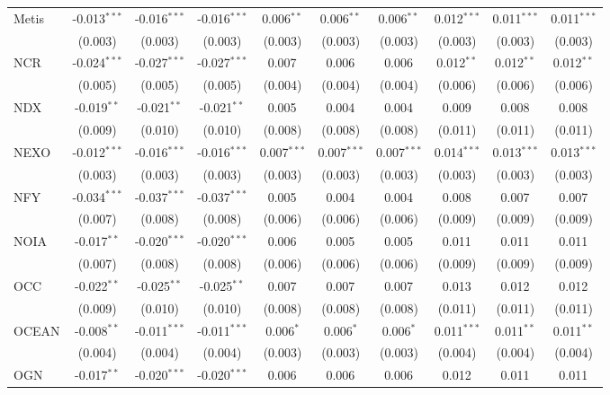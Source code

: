 \begin{table}[!htbp]
\begin{tabular}{@{\extracolsep{5pt}}lccccccccc}
 Metis & -0.013$^{***}$ & -0.016$^{***}$ & -0.016$^{***}$ & 0.006$^{**}$ & 0.006$^{**}$ & 0.006$^{**}$ & 0.012$^{***}$ & 0.011$^{***}$ & 0.011$^{***}$ \\
  & (0.003) & (0.003) & (0.003) & (0.003) & (0.003) & (0.003) & (0.003) & (0.003) & (0.003) \\
 NCR & -0.024$^{***}$ & -0.027$^{***}$ & -0.027$^{***}$ & 0.007$^{}$ & 0.006$^{}$ & 0.006$^{}$ & 0.012$^{**}$ & 0.012$^{**}$ & 0.012$^{**}$ \\
  & (0.005) & (0.005) & (0.005) & (0.004) & (0.004) & (0.004) & (0.006) & (0.006) & (0.006) \\
 NDX & -0.019$^{**}$ & -0.021$^{**}$ & -0.021$^{**}$ & 0.005$^{}$ & 0.004$^{}$ & 0.004$^{}$ & 0.009$^{}$ & 0.008$^{}$ & 0.008$^{}$ \\
  & (0.009) & (0.010) & (0.010) & (0.008) & (0.008) & (0.008) & (0.011) & (0.011) & (0.011) \\
 NEXO & -0.012$^{***}$ & -0.016$^{***}$ & -0.016$^{***}$ & 0.007$^{***}$ & 0.007$^{***}$ & 0.007$^{***}$ & 0.014$^{***}$ & 0.013$^{***}$ & 0.013$^{***}$ \\
  & (0.003) & (0.003) & (0.003) & (0.003) & (0.003) & (0.003) & (0.003) & (0.003) & (0.003) \\
 NFY & -0.034$^{***}$ & -0.037$^{***}$ & -0.037$^{***}$ & 0.005$^{}$ & 0.004$^{}$ & 0.004$^{}$ & 0.008$^{}$ & 0.007$^{}$ & 0.007$^{}$ \\
  & (0.007) & (0.008) & (0.008) & (0.006) & (0.006) & (0.006) & (0.009) & (0.009) & (0.009) \\
 NOIA & -0.017$^{**}$ & -0.020$^{***}$ & -0.020$^{***}$ & 0.006$^{}$ & 0.005$^{}$ & 0.005$^{}$ & 0.011$^{}$ & 0.011$^{}$ & 0.011$^{}$ \\
  & (0.007) & (0.008) & (0.008) & (0.006) & (0.006) & (0.006) & (0.009) & (0.009) & (0.009) \\
 OCC & -0.022$^{**}$ & -0.025$^{**}$ & -0.025$^{**}$ & 0.007$^{}$ & 0.007$^{}$ & 0.007$^{}$ & 0.013$^{}$ & 0.012$^{}$ & 0.012$^{}$ \\
  & (0.009) & (0.010) & (0.010) & (0.008) & (0.008) & (0.008) & (0.011) & (0.011) & (0.011) \\
 OCEAN & -0.008$^{**}$ & -0.011$^{***}$ & -0.011$^{***}$ & 0.006$^{*}$ & 0.006$^{*}$ & 0.006$^{*}$ & 0.011$^{***}$ & 0.011$^{**}$ & 0.011$^{**}$ \\
  & (0.004) & (0.004) & (0.004) & (0.003) & (0.003) & (0.003) & (0.004) & (0.004) & (0.004) \\
 OGN & -0.017$^{**}$ & -0.020$^{***}$ & -0.020$^{***}$ & 0.006$^{}$ & 0.006$^{}$ & 0.006$^{}$ & 0.012$^{}$ & 0.011$^{}$ & 0.011$^{}$ \\

\end{tabular}
\end{table}
